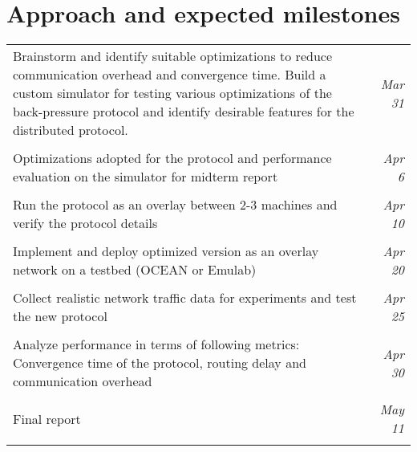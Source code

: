 \label{sec:timeline}
\section*{Approach and expected milestones}
\begin{tabular}{L{13.5cm} r}
Brainstorm and identify suitable optimizations to reduce communication overhead and convergence time. Build a custom simulator for testing various optimizations of the back-pressure protocol and identify desirable features for the distributed protocol. & \textit{Mar 31} \\\\
Optimizations adopted for the protocol and performance evaluation on the simulator for midterm report & \textit{Apr 6} \\\\
Run the protocol as an overlay between 2-3 machines and verify the protocol details & \textit{Apr 10}\\\\
Implement and deploy optimized version as an overlay network on a testbed (OCEAN or Emulab)  & \textit{Apr 20} \\\\
Collect realistic network traffic data for experiments and test the new protocol & \textit{Apr 25} \\\\
Analyze performance in terms of following metrics: Convergence time of the protocol, routing delay and communication overhead & \textit{Apr 30} \\\\
Final report & \textit{May 11} \\\\
\end{tabular}